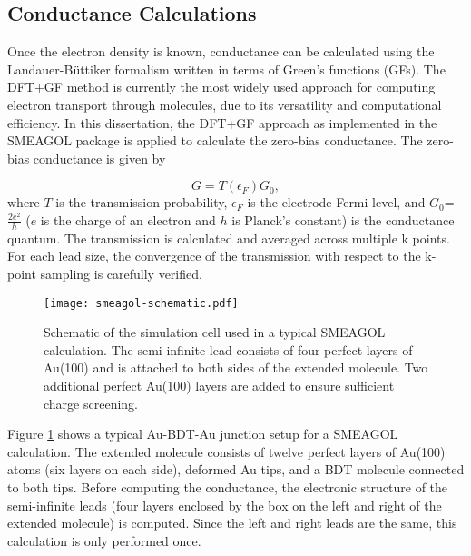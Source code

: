 \documentclass[10pt]{report}  %
\newcommand\findent{\hspace*{\parindent}}
\begin{document}
\subsection{Conductance Calculations}

\findent Once the electron density is known, conductance can be calculated using the Landauer-B\"{u}ttiker formalism\cite{Datta:1997} written in terms of Green's functions (GFs). The DFT+GF method is currently the most widely used approach for computing electron transport through molecules, due to its versatility and computational efficiency.\cite{Paulsson:2009,Strange:2010,Pontes:2011,Varga:2007,Sergueev:2010,Hu:2005,Basch:2005,Toher:2007,Toher:2008,Koentopp:2008,Strange:2008,Ke:2007} In this dissertation, the DFT+GF approach as implemented in the SMEAGOL package\cite{Rocha:2006,Rungger:2008} is applied to calculate the zero-bias conductance. The zero-bias conductance is given by

\begin{equation} G = T(\epsilon_{F})G_{0},\label{conductance}\end{equation} where $T$ is the transmission probability, $\epsilon_{F}$ is the electrode Fermi level, and $G_{0}$=$\frac{2e^{2}}{h}$ ($e$ is the charge of an electron and $h$ is Planck's constant) is the conductance quantum. The transmission is calculated and averaged across multiple k points. For each lead size, the convergence of the transmission with respect to the k-point sampling is carefully verified. 

\begin{figure}[b]
	\centering
	\texttt{[image: smeagol-schematic.pdf]}
	\caption{Schematic of the simulation cell used in a typical SMEAGOL calculation. The semi-infinite lead consists of four perfect layers of Au(100) and is attached to both sides of the extended molecule. Two additional perfect Au(100) layers are added to ensure sufficient charge screening.  }
	\label{fig:smeagol}
\end{figure}

Figure \ref{fig:smeagol} shows a typical Au-BDT-Au junction setup for a SMEAGOL calculation. The extended molecule consists of twelve perfect layers of Au(100) atoms (six layers on each side), deformed Au tips, and a BDT molecule connected to both tips. Before computing the conductance, the electronic structure of the semi-infinite leads (four layers enclosed by the box on the left and right of the extended molecule) is computed. Since the left and right leads are the same, this calculation is only performed once. 
\end{document}
